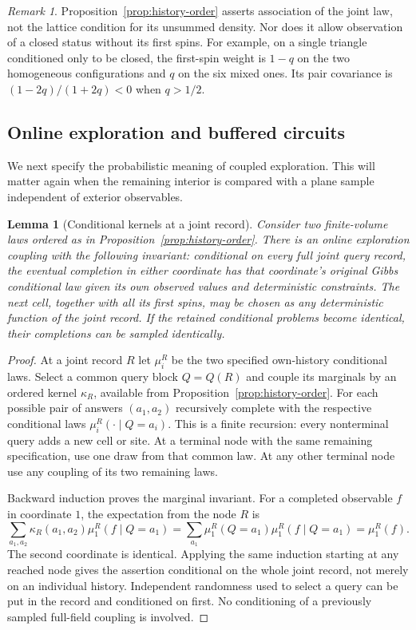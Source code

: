\documentclass[11pt]{article}
\newtheorem{lemma}[theorem]{Lemma}
\theoremstyle{definition}
\theoremstyle{remark}
\newtheorem{remark}[theorem]{Remark}
\numberwithin{equation}{section}
\begin{document}
\begin{remark}\label{discrete:not-raw-FKG}
Proposition~\ref{prop:history-order} asserts association of the joint law,
not the lattice condition for its unsummed density. Nor does it allow
observation of a closed status without its first spins. For example, on a
single triangle conditioned only to be closed, the first-spin weight is
$1-q$ on the two homogeneous configurations and $q$ on the six mixed
ones. Its pair covariance is $(1-2q)/(1+2q)<0$ when $q>1/2$.
\end{remark}

\subsection{Online exploration and buffered circuits}

We next specify the probabilistic meaning of coupled exploration. This
will matter again when the remaining interior is compared with a plane
sample independent of exterior observables.

\begin{lemma}[Conditional kernels at a joint record]\label{discrete:online}
Consider two finite-volume laws ordered as in
Proposition~\ref{prop:history-order}. There is an online exploration
coupling with the following invariant: conditional on every full joint
query record, the eventual completion in either coordinate has that
coordinate's original Gibbs conditional law given its own observed values
and deterministic constraints. The next cell, together with all its first
spins, may be chosen as any deterministic function of the joint record.
If the retained conditional problems become identical, their completions
can be sampled identically.
\end{lemma}
\begin{proof}
At a joint record $R$ let $\mu_i^R$ be the two specified own-history
conditional laws. Select a common query block $Q=Q(R)$ and couple its
marginals by an ordered kernel $\kappa_R$, available from
Proposition~\ref{prop:history-order}. For each possible pair of answers
$(a_1,a_2)$ recursively complete with the respective conditional laws
$\mu_i^R(\cdot\mid Q=a_i)$. This is a finite recursion: every nonterminal
query adds a new cell or site. At a terminal node with the same remaining
specification, use one draw from that common law. At any other terminal
node use any coupling of its two remaining laws.

Backward induction proves the marginal invariant. For a completed
observable $f$ in coordinate $1$, the expectation from the node $R$ is
\[
 \sum_{a_1,a_2}\kappa_R(a_1,a_2)
       \mu_1^R(f\mid Q=a_1)
 =\sum_{a_1}\mu_1^R(Q=a_1)\mu_1^R(f\mid Q=a_1)
 =\mu_1^R(f).
\]
The second coordinate is identical. Applying the same induction starting
at any reached node gives the assertion conditional on the whole joint
record, not merely on an individual history. Independent randomness used
to select a query can be put in the record and conditioned on first.
No conditioning of a previously sampled full-field coupling is involved.
\end{proof}
\end{document}
